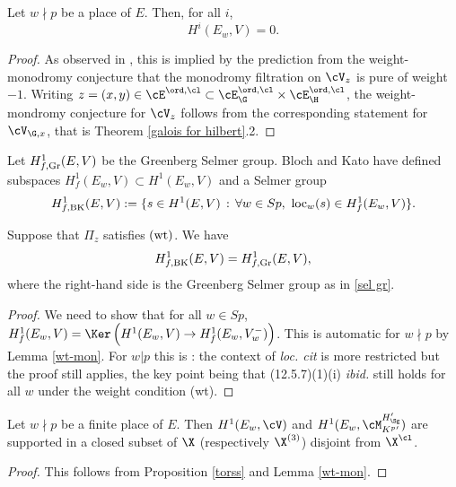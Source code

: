 \begin{lemm}\label{wt-mon} Let $w\nmid p$ be a place of $E$. Then, for all $i$,
$$H^{i}(E_{w},V)=0.$$
\end{lemm}
\begin{proof} As observed in \cite[Proposition 2.5]{nek-AJ}, this is implied by the prediction from the weight-monodromy conjecture that the monodromy filtration on $\cV_{z}$ is pure of weight $-1$. Writing $z=(x, y)\in \cE^{\ord, \cl}\subset \cE_{\G}^{\ord ,\cl}\times \cE_{\H}^{\ord, \cl}$, the weight-mondromy conjecture for $\cV_{z}$ follows from the corresponding statement for $\cV_{\G,x}$, that is Theorem \ref{galois for hilbert}.2.
\end{proof}
Let $H^{1}_{f, {\rm Gr}}({E}, V)$ be the Greenberg Selmer group.
  Bloch and Kato \cite{bk} have defined subspaces $H^{1}_{f}(E_{w}, V)\subset H^{1}(E_{w}, V)$ and a Selmer group
  $$H^{1}_{f, {\rm BK}}(E, V):= \{ s\in H^{1}_{}(E, V)\, :\, \forall w\in Sp, \ {\rm loc}_{w}(s)\in H^{1}_{f}(E_{w}, V)\}.
  $$
  \begin{lemm} Suppose that $\Pi_{z}$ satisfies $(\textup{wt})$. We have
  $$H^{1}_{f, {\rm BK}}(E, V) = H^{1}_{f, {\rm Gr}}(E, V),$$
  where the right-hand side  is the Greenberg Selmer group as in \eqref{sel gr}.
  \end{lemm}
\begin{proof} We need to show that for all $w\in Sp$, $ H^{1}_{f}(E_{w}, V)= \Ker \left(  H^{1}(E_{w}, V)\to  H^{1}_{f}(E_{w}, V_{w}^{-})\right)$. This is automatic for $w\nmid p$ by Lemma \ref{wt-mon}. For $w\vert p$ this is \cite[(12.5.8)]{nek-selmer}: the context of \emph{loc. cit} is more restricted but the proof still applies, the key point being that (12.5.7)(1)(i) \emph{ibid.} still holds for all $w$ under the weight condition (wt).
\end{proof}


\begin{lemm}\label{sel away from p} Let $w\nmid p$ be a finite place of $E$.  Then  $H^{1}(E_{w},\cV)$ and  $H^{1}(E_{w}, \cM_{K^{p}{}'}^{{H_{\Sg}'}}) $ are supported in a closed subset of $\X$ (respectively $\X^{(3)}$) disjoint from $\X^{ \cl}$.
\end{lemm}
\begin{proof}
This follows from Proposition  \ref{torss} and Lemma \ref{wt-mon}.
\end{proof}

















